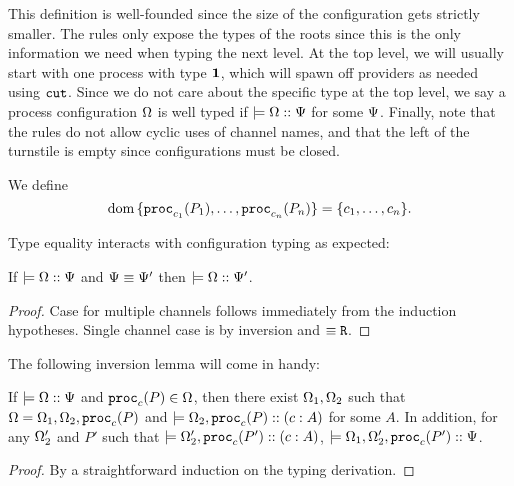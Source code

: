 This definition is well-founded since the size of the configuration gets strictly smaller. The rules only expose the types of the roots since this is the only information we need when typing the next level. At the top level, we will usually start with one process with type $\mathbf{1}$, which will spawn off providers as needed using $\texttt{cut}$. Since we do not care about the specific type at the top level, we say a process configuration $\Omega$ is well typed if $\models {\Omega} :: {\Psi}$ for some $\Psi$. Finally, note that the rules do not allow cyclic uses of channel names, and that the left of the turnstile is empty since configurations must be closed.


\begin{definition}
We define
\[\operatorname{dom} {\lbrace\mathtt{proc}_{c_1}(P_1), \ldots, \mathtt{proc}_{c_n}(P_n)\rbrace} = \lbrace c_1, \ldots, c_n\rbrace.\]
\end{definition}

Type equality interacts with configuration typing as expected:
\begin{lemma}
  \label{typeeq-configuration}
  If $\models {\Omega} :: {\Psi}$ and $\Psi \equiv \Psi'$ then $\models {\Omega} :: {\Psi'}$.
\end{lemma}
\begin{proof}
  Case for multiple channels follows immediately from the induction hypotheses. Single channel case is by inversion and $\equiv\texttt{R}$.
\end{proof}


The following inversion lemma will come in handy:
\begin{lemma}
  \label{inversion-configuration}
  If $\models {\Omega} :: {\Psi}$ and $\mathtt{proc}_{c}(P) \in \Omega$, then there exist $\Omega_1, \Omega_2$ such that $\Omega = \Omega_1, \Omega_2, \mathtt{proc}_{c}(P)$ and $\models {\Omega_2, \mathtt{proc}_{c}(P)} :: ({c} : {A})$ for some $A$. In addition, for any $\Omega_2'$ and $P'$ such that $\models {\Omega_2', \mathtt{proc}_{c}(P')} :: ({c} : {A})$, $\models {\Omega_1, \Omega_2', \mathtt{proc}_{c}(P')} :: {\Psi}$.
\end{lemma}
\begin{proof}
  By a straightforward induction on the typing derivation.
\end{proof}

